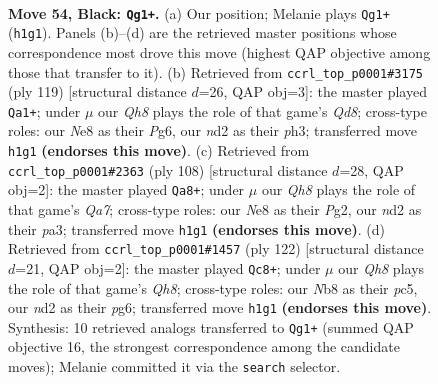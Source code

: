 \documentclass[11pt]{article}
\begin{document}
\clearpage

\begin{figure}[p]\centering
\begin{subfigure}{0.46\textwidth}\centering
\resizebox{\linewidth}{!}{%
\newchessgame
\chessboard[
  setfen={1n2n3/5k2/7p/Q7/P5K1/8/3N4/7q b - - 8 54},
  showmover=false,
  pgfstyle=straightmove, color=movearrow, markmove={h1-g1}
]}
\caption{}
\end{subfigure}\hfill
\begin{subfigure}{0.46\textwidth}\centering
\resizebox{\linewidth}{!}{%
\newchessgame
\chessboard[
  setfen={8/5p1k/Q5p1/P7/8/K6P/8/3q4 b - - 13 60},
  showmover=false,
  pgfstyle=straightmove, color=movearrow, markmove={d1-a1}
]}
\caption{}
\end{subfigure}
\\[4pt]
\begin{subfigure}{0.46\textwidth}\centering
\resizebox{\linewidth}{!}{%
\newchessgame
\chessboard[
  setfen={8/Q7/2k5/8/1q6/p2P3P/6P1/7K w - - 0 55},
  showmover=false,
  pgfstyle=straightmove, color=movearrow, markmove={a7-a8}
]}
\caption{}
\end{subfigure}\hfill
\begin{subfigure}{0.46\textwidth}\centering
\resizebox{\linewidth}{!}{%
\newchessgame
\chessboard[
  setfen={7Q/8/6p1/2pP4/6k1/4q3/6PK/8 w - - 6 62},
  showmover=false,
  pgfstyle=straightmove, color=movearrow, markmove={h8-c8}
]}
\caption{}
\end{subfigure}
\caption{\textbf{Move 54, Black: \texttt{Qg1+}.} (a) Our position; Melanie plays \texttt{Qg1+} (\texttt{h1g1}). Panels (b)--(d) are the retrieved master positions whose correspondence most drove this move (highest QAP objective among those that transfer to it). (b) Retrieved from \texttt{ccrl\_top\_p0001\#3175} (ply 119) [structural distance $d$=26, QAP obj=3]: the master played \texttt{Qa1+}; under $\mu$ our \emph{Qh8} plays the role of that game's \emph{Qd8}; cross-type roles: our \emph{N}e8 as their \emph{P}g6, our \emph{n}d2 as their \emph{p}h3; transferred move \texttt{h1g1} \textbf{(endorses this move)}. (c) Retrieved from \texttt{ccrl\_top\_p0001\#2363} (ply 108) [structural distance $d$=28, QAP obj=2]: the master played \texttt{Qa8+}; under $\mu$ our \emph{Qh8} plays the role of that game's \emph{Qa7}; cross-type roles: our \emph{N}e8 as their \emph{P}g2, our \emph{n}d2 as their \emph{p}a3; transferred move \texttt{h1g1} \textbf{(endorses this move)}. (d) Retrieved from \texttt{ccrl\_top\_p0001\#1457} (ply 122) [structural distance $d$=21, QAP obj=2]: the master played \texttt{Qc8+}; under $\mu$ our \emph{Qh8} plays the role of that game's \emph{Qh8}; cross-type roles: our \emph{N}b8 as their \emph{p}c5, our \emph{n}d2 as their \emph{p}g6; transferred move \texttt{h1g1} \textbf{(endorses this move)}. Synthesis: 10 retrieved analogs transferred to \texttt{Qg1+} (summed QAP objective 16, the strongest correspondence among the candidate moves); Melanie committed it via the \texttt{search} selector.}
\label{fig:thought-m107}
\end{figure}
\end{document}
